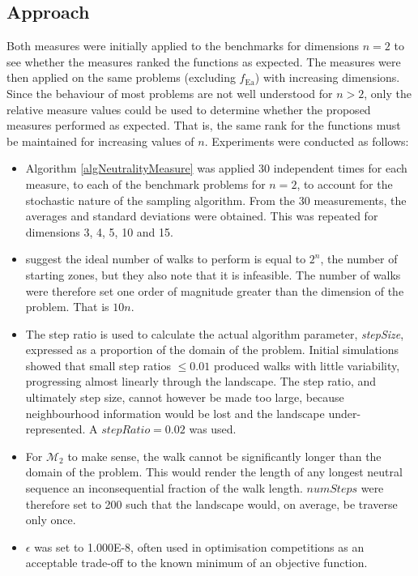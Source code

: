 \documentclass[conference]{IEEEtran}
\begin{document}
\subsection{Approach}
\label{visualApproach}
Both measures were initially applied to the benchmarks for dimensions $n=2$ to see whether the measures ranked the functions as expected. The measures were then applied on the same problems (excluding $f_{\text{Ea}}$) with increasing dimensions. Since the behaviour of most problems are not well understood for $n>2$, only the relative measure values could be used to determine whether the proposed measures performed as expected. That is, the same rank for the functions must be maintained for increasing values of $n$. Experiments were conducted as follows:

\begin{itemize}
	\item Algorithm \ref{algNeutralityMeasure} was applied 30 independent times for each measure, to each of the benchmark problems for $n=2$, to account for the stochastic nature of the sampling algorithm. From the 30 measurements, the averages and standard deviations were obtained. This was repeated for dimensions 3, 4, 5, 10 and 15.
	\item \citet{malan2014progressive} suggest the ideal number of walks to perform is equal to $2^n$, the number of starting zones, but they also note that it is infeasible. The number of walks were therefore set one order of magnitude greater than the dimension of the problem. That is $10n$.
	\item The step ratio is used to calculate the actual algorithm parameter, \textit{stepSize}, expressed as a proportion of the domain of the problem. Initial simulations showed that small step ratios $\le 0.01$ produced walks with little variability, progressing almost linearly through the landscape. The step ratio, and ultimately step size, cannot however be made too large, because neighbourhood information would be lost and the landscape under-represented. A $\textit{stepRatio} = 0.02$ was used.
	\item For $\mathcal{M}_2$ to make sense, the walk cannot be significantly longer than the domain of the problem. This would render the length of any longest neutral sequence an inconsequential fraction of the walk length. $numSteps$ were therefore set to 200 such that the landscape would, on average, be traverse only once.
	\item $\epsilon$ was set to 1.000E-8, often used in optimisation competitions as an acceptable trade-off to the known minimum of an objective function.
\end{itemize}
\end{document}

